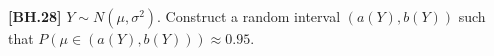 \begin{exercise}
	\textbf{[BH.28]}  $Y \sim  {N}\left(\mu, \sigma^2\right)$. Construct a random interval $(a(Y), b(Y))$ such that $P(\mu\in(a(Y), b(Y)) ) \approx 0.95$.
\end{exercise}